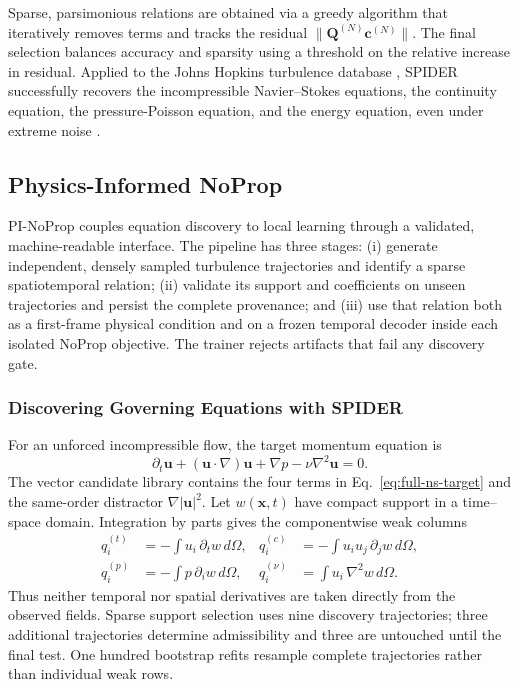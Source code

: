 \documentclass[preprint,12pt]{elsarticle}
\begin{document}
Sparse, parsimonious relations are obtained via a greedy algorithm that iteratively removes terms and tracks the residual $\|\mathbf{Q}^{(N)}\mathbf{c}^{(N)}\|$. The final selection balances accuracy and sparsity using a threshold on the relative increase in residual. Applied to the Johns Hopkins turbulence database \cite{li2008public}, SPIDER successfully recovers the incompressible Navier--Stokes equations, the continuity equation, the pressure-Poisson equation, and the energy equation, even under extreme noise \cite{gurevich2024learning}.

\subsection{Physics-Informed NoProp}
\label{sec:physics-noprop}

PI-NoProp couples equation discovery to local learning through a validated,
machine-readable interface.  The pipeline has three stages: (i) generate
independent, densely sampled turbulence trajectories and identify a sparse
spatiotemporal relation; (ii) validate its support and coefficients on unseen
trajectories and persist the complete provenance; and (iii) use that relation
both as a first-frame physical condition and on a frozen temporal decoder
inside each isolated NoProp objective. The trainer rejects artifacts that fail
any discovery gate.

\subsubsection{Discovering Governing Equations with SPIDER}
\label{sec:discovering-equations}

For an unforced incompressible flow, the target momentum equation is
\begin{equation}
\partial_t\mathbf u+(\mathbf u\cdot\nabla)\mathbf u+\nabla p
-\nu\nabla^2\mathbf u=0.
\label{eq:full-ns-target}
\end{equation}
The vector candidate library contains the four terms in
Eq.~\eqref{eq:full-ns-target} and the same-order distractor
$\nabla|\mathbf u|^2$.  Let $w(\mathbf x,t)$ have compact support in a
time--space domain. Integration by parts gives the componentwise weak columns
\begin{equation}
\begin{aligned}
q_i^{(t)}&=-\int u_i\,\partial_t w\,d\Omega, &
q_i^{(c)}&=-\int u_i u_j\,\partial_jw\,d\Omega,\\
q_i^{(p)}&=-\int p\,\partial_iw\,d\Omega, &
q_i^{(\nu)}&=\int u_i\,\nabla^2w\,d\Omega.
\end{aligned}
\label{eq:full-ns-weak-columns}
\end{equation}
Thus neither temporal nor spatial derivatives are taken directly from the
observed fields.  Sparse support selection uses nine discovery trajectories;
three additional trajectories determine admissibility and three are untouched
until the final test. One hundred bootstrap refits resample complete
trajectories rather than individual weak rows.
\end{document}
